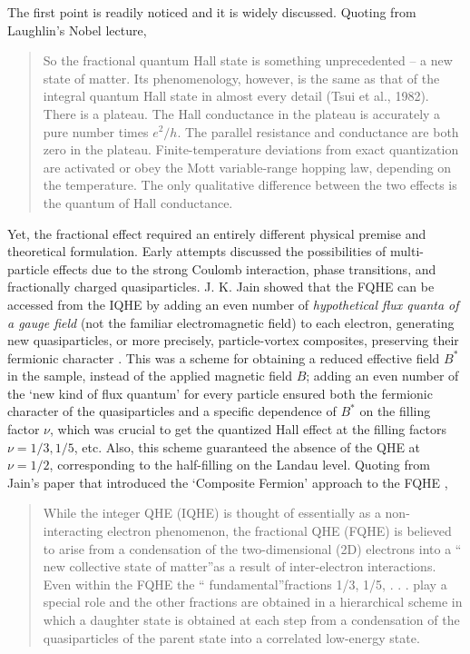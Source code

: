 \documentclass[aps,preprint,12pt,tightenlines]{revtex4}%
\begin{document}
The first point is readily noticed and it is widely discussed. Quoting from
Laughlin's Nobel lecture,

\begin{quote}
So the fractional quantum Hall state is something unprecedented -- a new state
of matter. Its phenomenology, however, is the same as that of the integral
quantum Hall state in almost every detail (Tsui et al., 1982). There is a
plateau. The Hall conductance in the plateau is accurately a pure number times
$e^{2}/h$. The parallel resistance and conductance are both zero in the
plateau. Finite-temperature deviations from exact quantization are activated
or obey the Mott variable-range hopping law, depending on the temperature. The
only qualitative difference between the two effects is the quantum of Hall conductance.
\end{quote}

Yet, the fractional effect required an entirely different physical premise and
theoretical formulation. Early attempts discussed the possibilities of
multi-particle effects due to the strong Coulomb interaction, phase
transitions, and fractionally charged quasiparticles. J. K. Jain showed that
the FQHE can be accessed from the IQHE by adding an even number of
\textit{hypothetical flux quanta of a gauge field} (not the familiar
electromagnetic field) to each electron, generating new quasiparticles, or
more precisely, particle-vortex composites, preserving their fermionic
character \cite{Jain-PRL}. This was a scheme for obtaining a reduced effective
field $B^{\ast}$ in the sample, instead of the applied magnetic field $B$;
adding an even number of the `new kind of flux quantum' for every particle
ensured both the fermionic character of the quasiparticles and a specific
dependence of $B^{\ast}$ on the filling factor $\nu$, which was crucial to get
the quantized Hall effect at the filling factors $\nu=1/3,1/5$, etc. Also,
this scheme guaranteed the absence of the QHE at $\nu=1/2$, corresponding to
the half-filling on the Landau level. Quoting from Jain's paper that
introduced the `Composite Fermion' approach to the FQHE \cite{Jain-PRL},

\begin{quote}
While the integer QHE (IQHE) is thought of essentially as a non-interacting
electron phenomenon, the fractional QHE (FQHE) is believed to arise from a
condensation of the two-dimensional (2D) electrons into a \textquotedblleft
new collective state of matter\textquotedblright as a result of
inter-electron interactions. Even within the FQHE the \textquotedblleft
fundamental\textquotedblright fractions 1/3, 1/5, . . . play a special role
and the other fractions are obtained in a hierarchical scheme in which a
daughter state is obtained at each step from a condensation of the
quasiparticles of the parent state into a correlated low-energy state.
\end{quote}
\end{document}
